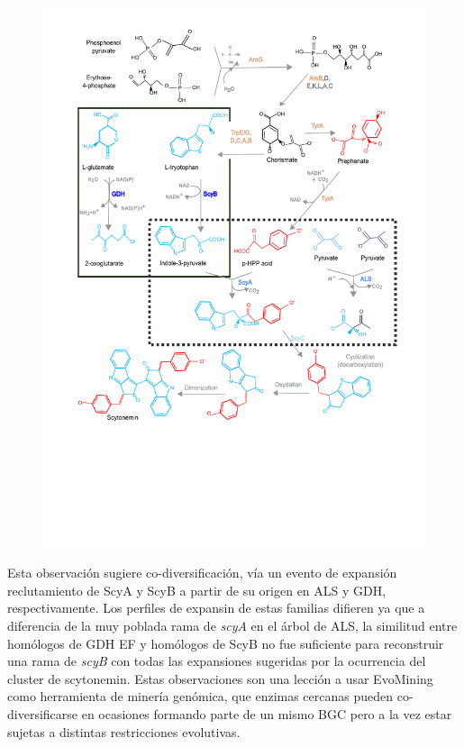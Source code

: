\documentclass[12pt,twoside]{reedthesis}
\begin{document}
  \begin{figure}[h!tbp]
  \centering
  \includegraphics[angle = 0,scale = .8]{chapter2/FigurasPaper/Figure6.pdf}
  \caption[EvoMining Algorithm]{\footnotesize{}}
  \label{fig:Ruta}
  \end{figure}
  
  Esta observación sugiere co-diversificación, vía un evento de expansión
  reclutamiento de ScyA y ScyB a partir de su origen en ALS y GDH,
  respectivamente. Los perfiles de expansin de estas familias difieren ya
  que a diferencia de la muy poblada rama de \emph{scyA} en el árbol de
  ALS, la similitud entre homólogos de GDH EF y homólogos de ScyB no fue
  suficiente para reconstruir una rama de \emph{scyB} con todas las
  expansiones sugeridas por la ocurrencia del cluster de scytonemin. Estas
  observaciones son una lección a usar EvoMining como herramienta de
  minería genómica, que enzimas cercanas pueden co-diversificarse en
  ocasiones formando parte de un mismo BGC pero a la vez estar sujetas a
  distintas restricciones evolutivas.
  
\end{document}
